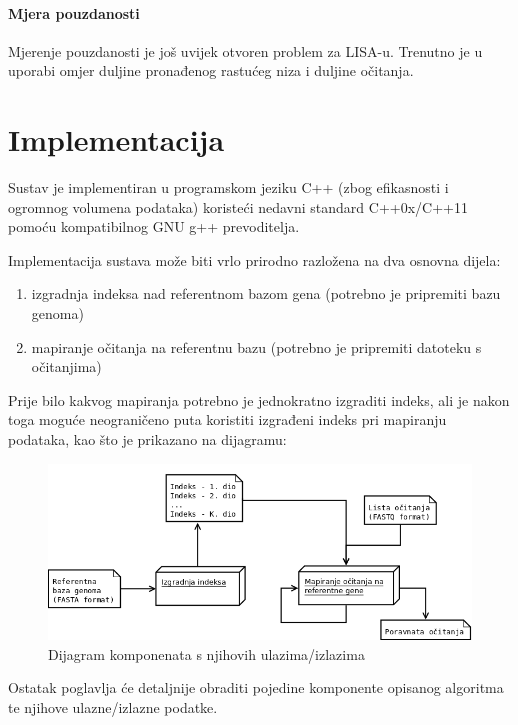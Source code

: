 \documentclass[times, utf8, diplomski]{fer}
\begin{document}
\subsubsection{Mjera pouzdanosti}

Mjerenje pouzdanosti je još uvijek otvoren problem za LISA-u. Trenutno je u uporabi omjer duljine pronađenog rastućeg niza i duljine očitanja.

\chapter{Implementacija}

Sustav je implementiran u programskom jeziku C++ (zbog efikasnosti i ogromnog volumena podataka) koristeći nedavni standard C++0x/C++11 pomoću kompatibilnog GNU g++ prevoditelja.

Implementacija sustava može biti vrlo prirodno razložena na dva osnovna dijela:

\begin{enumerate}
\item izgradnja indeksa nad referentnom bazom gena (potrebno je pripremiti bazu genoma)
\item mapiranje očitanja na referentnu bazu (potrebno je pripremiti datoteku s očitanjima)
\end{enumerate}

Prije bilo kakvog mapiranja potrebno je jednokratno izgraditi indeks, ali je nakon toga moguće neograničeno puta koristiti izgrađeni indeks pri mapiranju podataka, kao što je prikazano na dijagramu:

\begin{figure}[!ht]
\begin{center}
	\includegraphics[width=1\textwidth]{../img/Komponente.png}
	\caption{Dijagram komponenata s njihovih ulazima/izlazima}
\end{center}
\end{figure}


Ostatak poglavlja će detaljnije obraditi pojedine komponente opisanog algoritma te njihove ulazne/izlazne podatke.
\end{document}
